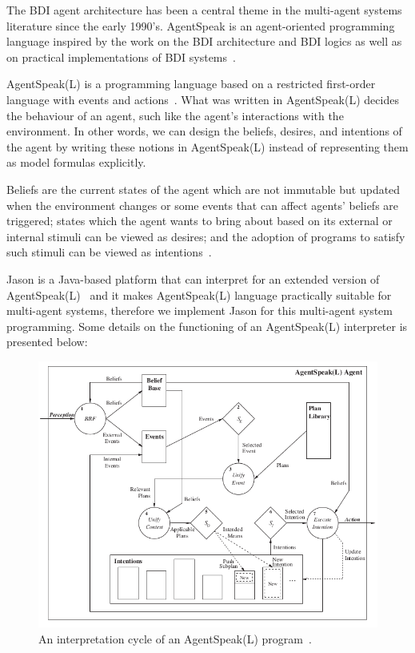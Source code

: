 The BDI agent architecture has been a central theme in the multi-agent systems literature since the early 1990's.
AgentSpeak is an agent-oriented programming language inspired by the work on the BDI architecture and BDI logics as well as on practical implementations of BDI systems~\cite{rafael_BDIAgent_2005}.

AgentSpeak(L) is a programming language based on a restricted first-order language with events and actions~\cite{anand_AgentSpeak_1996}.
What was written in AgentSpeak(L) decides the behaviour of an agent, such like the agent's interactions with the environment.
In other words, we can design the beliefs, desires, and intentions of the agent by writing these notions in AgentSpeak(L) instead of representing them as model formulas explicitly.

Beliefs are the current states of the agent which are not immutable but updated when the environment changes or some events that can affect agents' beliefs are triggered; states which the agent wants to bring about based on its external or internal stimuli can be viewed as desires; and the adoption of programs to satisfy such stimuli can be viewed as intentions~\cite{anand_AgentSpeak_1996}.

Jason is a Java-based platform that can interpret for an extended version of AgentSpeak(L)~\cite{rafael_Javabased_2007} and it makes AgentSpeak(L) language practically suitable for multi-agent systems, therefore we implement Jason for this multi-agent system programming.
Some details on the functioning of an AgentSpeak(L) interpreter is presented below:

\begin{figure}[h]
  \centering
  \includegraphics[width=\textwidth]{images/BDI_ASL_interpreter}
  \caption{An interpretation cycle of an AgentSpeak(L) program~\cite{rafael_BDIAgent_2005}.}
  \label{fig:ASL_interpreter}
\end{figure}

